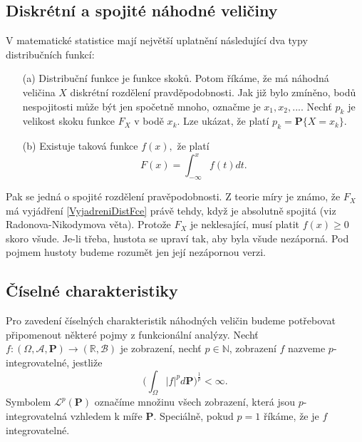 \subsection{Diskrétní a spojité náhodné veličiny}
V matematické statistice mají největší uplatnění následující dva typy distribučních funkcí:
\begin{itemize}
\item[(a)] Distribuční funkce je funkce skoků. Potom říkáme, že má náhodná veličina $X$ diskrétní rozdělení pravděpodobnosti. Jak již bylo zmíněno, bodů nespojitosti může být jen spočetně mnoho, označme je $x_{1}, x_{2}, ...$. Nechť $p_{k}$ je velikost skoku funkce $F_{X}$ v bodě $x_{k}$. Lze ukázat, že platí $p_{k} = \textbf{P}\lbrace X = x_{k} \rbrace$.
\item[(b)] Existuje taková funkce $f(x), $ že platí
\begin{equation}\label{VyjadreniDistFce}
F(x) = \int_{-\infty}^{x}f(t)dt.
\end{equation}
\end{itemize}
Pak se jedná o spojité rozdělení pravěpodobnosti. Z teorie míry je známo, že $F_{X}$ má vyjádření \eqref{VyjadreniDistFce} právě tehdy, když je absolutně spojitá (viz Radonova-Nikodymova věta). Protože $F_{X}$ je neklesající, musí platit $f(x) \geq 0$ skoro všude. Je-li třeba, hustota se upraví tak, aby byla všude nezáporná. Pod pojmem hustoty budeme rozumět jen její nezápornou verzi.
\subsection{Číselné charakteristiky}
Pro zavedení číselných charakteristik náhodných veličin budeme potřebovat připomenout některé pojmy z funkcionální analýzy. Nechť $f : (\Omega, \mathcal{A}, \textbf{P}) \longrightarrow (\mathbb{R}, \mathcal{B})$ je zobrazení, nechť $p \in \mathbb{N}$, zobrazení $f$ nazveme $p$-integrovatelné, jestliže
\begin{equation}
\bigg(\int_{\Omega}|f|^{p} d\textbf{P}\bigg)^{\frac{1}{p}} < \infty.
\end{equation}
Symbolem $\mathcal{L}^{p}(\textbf{P})$ označíme množinu všech zobrazení, která jsou $p$-integrovatelná vzhledem k míře $\textbf{P}$. Speciálně, pokud $p = 1$ říkáme, že je $f$ integrovatelné.

